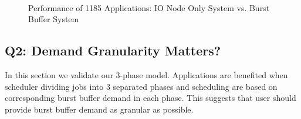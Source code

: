 \begin{figure}[!t]
        \centering
        ~
        \caption{Performance of 1185 Applications: IO Node Only System vs. Burst Buffer System}
        \label{Fig:DirectIOPerformance}
\end{figure}


\subsection{Q2: Demand Granularity Matters?}
In this section we validate our 3-phase model.
Applications are benefited when scheduler dividing jobs into 3 separated phases and 
scheduling are based on corresponding burst buffer demand in each phase.
This suggests that user should provide burst buffer demand as granular as possible.


